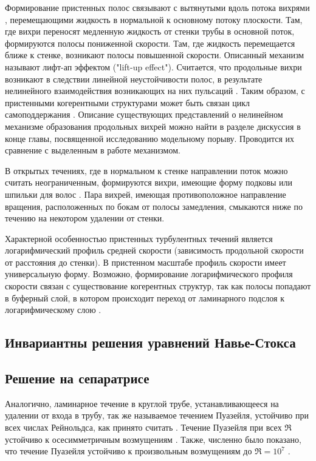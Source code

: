Формирование пристенных полос связывают с вытянутыми вдоль потока вихрями \cite{Blackwelder1979, Jeong1997}, перемещающими жидкость в нормальной к основному потоку плоскости. Там, где вихри переносят медленную жидкость от стенки трубы в основной поток, формируются полосы пониженной скорости. Там, где жидкость перемещается ближе к стенке, возникают полосы повышенной скорости. Описанный механизм называют лифт-ап эффектом ("lift-up effect"). Считается, что продольные вихри возникают в следствии линейной неустойчивости полос, в результате нелинейного взаимодействия возникающих на них пульсаций \cite{Hamilton1995, Schoppa2002, Kawahara2003}. Таким образом, с пристенными когерентными структурами может быть связан цикл самоподдержания \cite{Hamilton1995, Waleffe1997}. Описание существующих представлений о нелинейном механизме образования продольных вихрей можно найти в разделе дискуссия в конце главы, посвященной исследованию модельному порыву. Проводится их сравнение с выделенным в работе механизмом.   

В открытых течениях, где в нормальном к стенке направлении поток можно считать неограниченным, формируются вихри, имеющие форму подковы или шпильки для волос \cite{Head1981, Robinson1991, Adrian2000, Adrian2007}. Пара вихрей, имеющая противоположное направление вращения, расположенных по бокам от полосы замедления, смыкаются ниже по течению на некотором удалении от стенки. 

Характерной особенностью пристенных турбулентных течений является логарифмический профиль средней скорости (зависимость продольной скорости от расстояния до стенки). В пристенном масштабе профиль скорости имеет универсальную форму. Возможно, формирование логарифмического профиля скорости связан с существование когерентных структур, так как полосы попадают в буферный слой, в котором происходит переход от ламинарного подслоя к логарифмическому слою \cite{}. 


	\subsection{Инвариантны решения уравнений Навье-Стокса}



	\subsection{Решение на сепаратрисе}

Аналогично, ламинарное течение в круглой трубе, устанавливающееся на удалении от входа в трубу, так же называемое течением Пуазейля, устойчиво при всех числах Рейнольдса, как принято считать \cite{Kerswell2005}. Течение Пуазейля при всех $\Re$ устойчиво к осесимметричным возмущениям \cite{Salwen1980}. Также, численно было показано, что течение Пуазейля устойчиво к произвольным возмущениям до $\Re = 10^7$ \cite{Meseguer2003}. 

